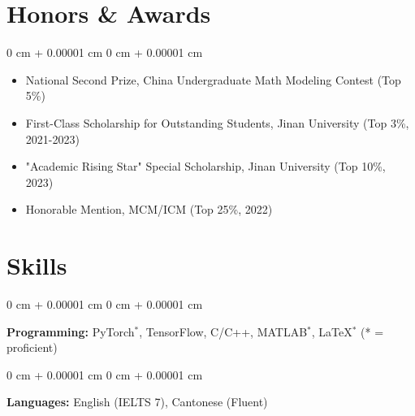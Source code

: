 \documentclass[10pt, letterpaper]{article}
\newenvironment{highlightsforbulletentries}{
    \begin{itemize}[
        topsep=0.10 cm,
        parsep=0.10 cm,
        partopsep=0pt,
        itemsep=0pt,
        leftmargin=10pt
    ]
}{
    \end{itemize}
} %
\newenvironment{onecolentry}{
    \begin{adjustwidth}{
        0 cm + 0.00001 cm
    }{
        0 cm + 0.00001 cm
    }
}{
    \end{adjustwidth}
} %
\begin{document}
\section{Honors \& Awards}

    \begin{onecolentry}
        \begin{highlightsforbulletentries}
            \item National Second Prize, China Undergraduate Math Modeling Contest (Top 5\%)
            \item First-Class Scholarship for Outstanding Students, Jinan University (Top 3\%, 2021-2023)
            \item "Academic Rising Star" Special Scholarship, Jinan University (Top 10\%, 2023)
            \item Honorable Mention, MCM/ICM (Top 25\%, 2022)
        \end{highlightsforbulletentries}
    \end{onecolentry}

\section{Skills}

    \begin{onecolentry}
        \textbf{Programming:} PyTorch$^*$, TensorFlow, C/C++, MATLAB$^*$, LaTeX$^*$ \hfill (* = proficient)
    \end{onecolentry}

    \vspace{0.2 cm}

    \begin{onecolentry}
        \textbf{Languages:} English (IELTS 7), Cantonese (Fluent)
    \end{onecolentry}

    
\end{document}
